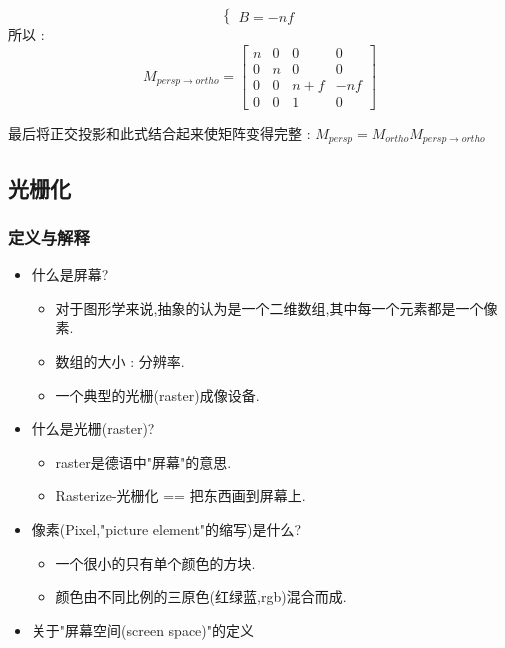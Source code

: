 {{{\begin{itemize}
{\begin{itemize}
{$$\begin{cases}
                          B = -nf
                        \end{cases}
                      $$
                      所以 : $$
                        M_{persp \to ortho}
                        =
                        \begin{bmatrix}
                          n & 0 & 0     & 0   \\
                          0 & n & 0     & 0   \\
                          0 & 0 & n + f & -nf \\
                          0 & 0 & 1     & 0
                        \end{bmatrix}
                      $$

                      最后将正交投影和此式结合起来使矩阵变得完整 : $M_{persp} = M_{ortho}M_{persp \to ortho}$
                      }
              \end{itemize}
              }
      \end{itemize}


    }%

  }%

  \subsection{光栅化}{

    \subsubsection{定义与解释}{
      \begin{itemize}
        \item {
              什么是屏幕?
              \begin{itemize}
                \item 对于图形学来说,抽象的认为是一个二维数组,其中每一个元素都是一个像素.
                \item 数组的大小 : 分辨率.
                \item 一个典型的光栅(raster)成像设备.
              \end{itemize}
              }
        \item{
              什么是光栅(raster)?
              \begin{itemize}
                \item raster是德语中"屏幕"的意思.
                \item Rasterize-光栅化 == 把东西画到屏幕上.
              \end{itemize}
              }
        \item{
              像素(Pixel,"picture element"的缩写)是什么?
              \begin{itemize}
                \item 一个很小的只有单个颜色的方块.
                \item 颜色由不同比例的三原色(红绿蓝,rgb)混合而成.
              \end{itemize}
              }
        \item{
              关于"屏幕空间(screen space)"的定义

}
\end{itemize}}}}
